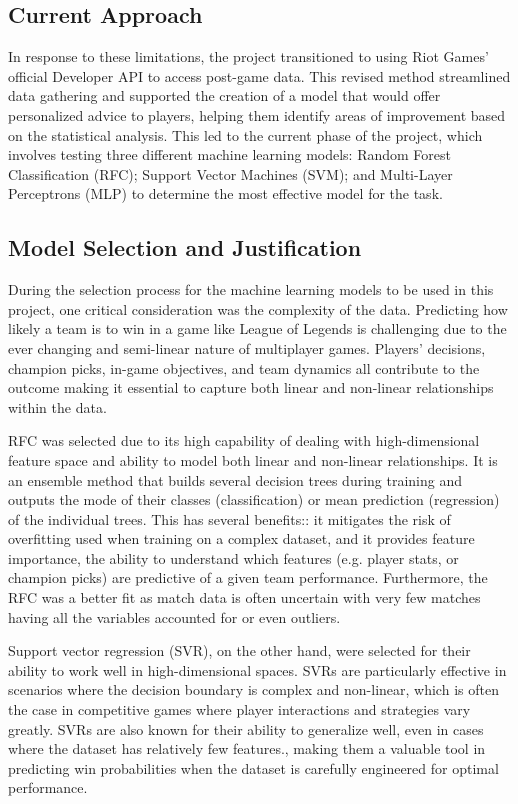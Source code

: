 \documentclass[10pt,twocolumn]{article}
\begin{document}
\subsection{Current Approach}
In response to these limitations, the project transitioned to using Riot Games' official Developer API to access post-game data. This revised method streamlined data gathering and supported the creation of a model that would offer personalized advice to players, helping them identify areas of improvement based on the statistical analysis. This led to the current phase of the project, which involves testing three different machine learning models: Random Forest Classification (RFC); Support Vector Machines (SVM); and Multi-Layer Perceptrons (MLP) to determine the most effective model for the task. 

\subsection{Model Selection and Justification}
During the selection process for the machine learning models to be used in this project, one critical consideration was the complexity of the data. Predicting how likely a team is to win in a game like League of Legends is challenging due to the ever changing and semi-linear nature of multiplayer games. Players' decisions, champion picks, in-game objectives, and team dynamics all contribute to the outcome making it essential to capture both linear and non-linear relationships within the data.

RFC was selected due to its high capability of dealing with high-dimensional feature space and ability to model both linear and non-linear relationships. It is an ensemble method that builds several decision trees during training and outputs the mode of their classes (classification) or mean prediction (regression) of the individual trees. This has several benefits:: it mitigates the risk of overfitting used when training on a complex dataset, and it provides feature importance, the ability to understand which features (e.g. player stats, or champion picks) are predictive of a given team performance. Furthermore, the RFC was a better fit as match data is often uncertain with very few matches having all the variables accounted for or even outliers.

Support vector regression (SVR), on the other hand, were selected for their ability to work well in high-dimensional spaces. SVRs are particularly effective in scenarios where the decision boundary is complex and non-linear, which is often the case in competitive games where player interactions and strategies vary greatly. SVRs are also known for their ability to generalize well, even in cases where the dataset has relatively few features., making them a valuable tool in predicting win probabilities when the dataset is carefully engineered for optimal performance.
\end{document}
